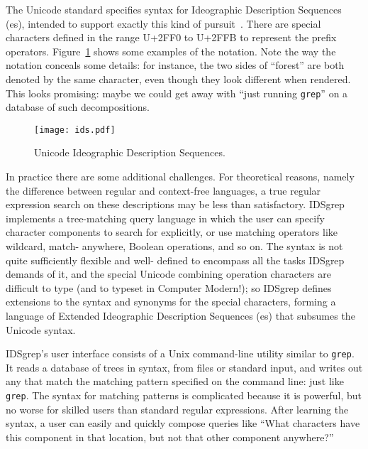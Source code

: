 \documentclass{ltugboat}
\begin{document}
The Unicode standard specifies syntax for Ideographic Description Sequences
(es), intended to support exactly this kind of
pursuit~\cite{Unicode:IDS}.  There are special characters defined in the
range U+2FF0 to U+2FFB to represent the prefix operators. 
Figure~\ref{fig:ids} shows some examples of the notation.  Note the way the
 notation conceals some details: for instance, the two sides of
``forest'' are both denoted by the same character, even though they look
different when rendered.  This looks promising:  maybe we could get away
with ``just running \verb|grep|'' on a database of such decompositions.

\begin{figure}
\centering
\texttt{[image: ids.pdf]}
\caption{Unicode Ideographic Description Sequences.}
\label{fig:ids}
\end{figure}

In practice there are some additional challenges.  For theoretical reasons,
namely the difference between regular and context-free languages, a true
regular expression search on these descriptions may be less than
satisfactory.  IDSgrep implements a tree-matching query language in which
the user can specify character components to search for explicitly, or use
matching operators like wildcard, match-
\linebreak%
anywhere, Boolean operations, and so
on.  The  syntax is not quite sufficiently flexible and
well-
\linebreak%
defined to encompass all the tasks IDSgrep demands of it, and the
special Unicode combining operation characters are difficult to type (and to
typeset in Computer Modern!); so IDSgrep defines extensions to the syntax
and  synonyms for the special characters,
forming a language of Extended Ideographic Description Sequences
(es) that subsumes the 
Unicode  syntax.

IDSgrep's user interface consists of a Unix 
\linebreak%
command-line utility similar to
\verb|grep|.  It reads a database of trees in  syntax, from files
or standard input, and writes out any that match the
\linebreak%
 matching pattern
specified on the command line:  just like \verb|grep|.  The syntax for
matching patterns is complicated because it is powerful, but no worse for
skilled users than standard regular expressions.  After learning the syntax,
a user can easily and quickly compose queries like ``What characters have
this
\linebreak%
component in that location, but not that other component anywhere?''
\end{document}
